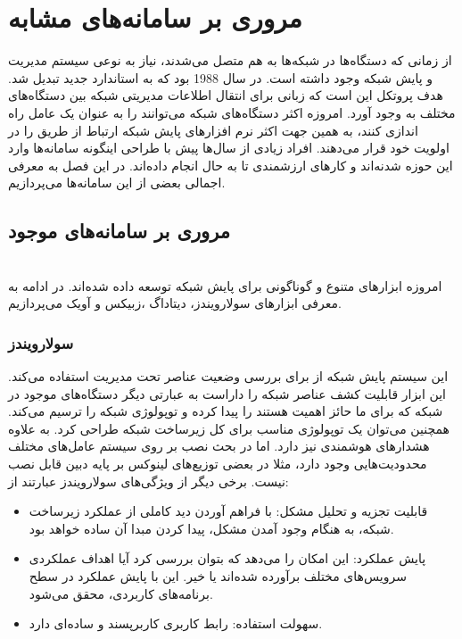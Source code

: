 \chapter{مروری بر سامانه‌های مشابه}

از زمانی که دستگاه‌ها در شبکه‌ها به هم متصل می‌شدند، نیاز به نوعی سیستم مدیریت و پایش شبکه وجود داشته است. در سال 1988 بود که  به استاندارد جدید تبدیل شد. هدف پروتکل  این است که زبانی برای انتقال اطلاعات مدیریتی شبکه بین دستگاه‌های مختلف به وجود آورد. امروزه اکثر دستگاه‌های شبکه می‌توانند  را به عنوان یک عامل راه اندازی کنند، به همین جهت اکثر نرم افزارهای پایش شبکه ارتباط از طریق  را در اولویت خود قرار می‌دهند.
افراد زیادی از سال‌ها پیش با طراحی اینگونه سامانه‌ها وارد این حوزه شدنه‌اند و کارهای ارزشمندی تا به حال انجام داده‌اند. در این فصل به معرفی اجمالی بعضی از این سامانه‌ها می‌پردازیم.

\section{مروری بر سامانه‌های موجود}
\\
امروزه ابزارهای متنوع و گوناگونی برای پایش شبکه توسعه داده شده‌اند. در ادامه به معرفی ابزارهای سولارویندز، دیتاداگ ،زبیکس و آویک می‌پردازیم.



\subsection{سولارویندز}

این سیستم پایش شبکه از  برای بررسی وضعیت عناصر تحت مدیریت استفاده می‌کند. این ابزار قابلیت کشف عناصر شبکه را داراست به عبارتی دیگر دستگاه‌های موجود در شبکه که برای ما حائز اهمیت هستند را پیدا کرده و توپولوژی شبکه را ترسیم می‌کند. همچنین می‌توان یک توپولوژی مناسب برای کل زیرساخت شبکه طراحی کرد. به علاوه هشدارهای هوشمندی نیز دارد. اما در بحث نصب بر روی سیستم‌ عامل‌های مختلف محدودیت‌هایی وجود دارد، مثلا در بعضی توزیع‌های لینوکس بر پایه دبین قابل نصب نیست. برخی دیگر از ویژگی‌های سولارویندز عبارتند از:

\begin{itemize}
    \item قابلیت تجزیه و تحلیل مشکل: با فراهم آوردن دید کاملی از عملکرد زیرساخت شبکه، به هنگام وجود آمدن مشکل، پیدا کردن مبدا آن ساده خواهد بود.
    \item پایش عملکرد: این امکان را می‌دهد که بتوان بررسی کرد آیا اهداف عملکردی سرویس‌های مختلف برآورده شده‌اند یا خیر. این با پایش عملکرد در سطح برنامه‌های کاربردی، محقق می‌شود.
    \item سهولت استفاده: رابط کاربری کاربرپسند و ساده‌ای دارد.
\end{itemize}

